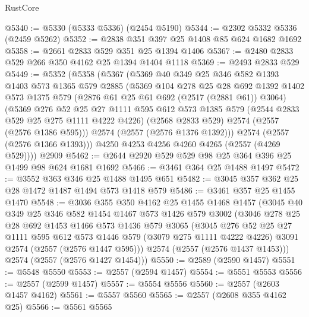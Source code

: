 \begin{lexlean}{RustCore}
\begin{coremodule}
@5340 := @5330 (@5333 @5336) (@2454 @5190)
@5344 := @2302 @5332 @5336 (@2459 @5262)
@5352 := @2838 @351 @397 @25 @1408 @85 @624 @1682 @1692
@5358 := @2661 @2833 @529 @351 @25 @1394 @1406
@5367 := @2480 @2833 @529 @266 @350 @4162 @25 @1394 @1404 @1118
@5369 := @2493 @2833 @529
@5449 := @5352
    (@5358
      (@5367
        (@5369
          @40
          @349
          @25
          @346
          @582
          @1393
          @1403
          @573
          @1365
          @579
          @2885
          (@5369
            @104
            @278
            @25
            @28
            @692
            @1392
            @1402
            @573
            @1375
            @579
            (@2876 @61 @25 @61 @692 (@2517 (@2881 @61)) @3064)
            (@5369
              @276
              @52
              @25
              @27
              @1111
              @595
              @612
              @573
              @1385
              @579
              (@2544 @2833 @529 @25 @275 @1111 @4222 @4226)
              (@2568 @2833 @529)
              @2574
              (@2557 (@2576 @1386 @595)))
            @2574
            (@2557 (@2576 @1376 @1392)))
          @2574
          (@2557 (@2576 @1366 @1393)))
        @4250
        @4253
        @4256
        @4260
        @4265
        (@2557 (@4269 @529))))
    @2909
@5462 := @2644 @2920 @529 @529 @98 @25 @364 @396 @25 @1499 @98 @624 @1681 @1692
@5466 := @3461 @364 @25 @1488 @1497
@5472 := @3552 @363 @346 @25 @1488 @1495 @651
@5482 := @3045 @357 @362 @25 @28 @1472 @1487 @1494 @573 @1418 @579
@5486 := @3461 @357 @25 @1455 @1470
@5548 := @3036
    @355
    @350
    @4162
    @25
    @1455
    @1468
    @1457
    (@3045
      @40
      @349
      @25
      @346
      @582
      @1454
      @1467
      @573
      @1426
      @579
      @3002
      (@3046
        @278
        @25
        @28
        @692
        @1453
        @1466
        @573
        @1436
        @579
        @3065
        (@3045
          @276
          @52
          @25
          @27
          @1111
          @595
          @612
          @573
          @1446
          @579
          (@3079 @275 @1111 @4222 @4226)
          @3091
          @2574
          (@2557 (@2576 @1447 @595)))
        @2574
        (@2557 (@2576 @1437 @1453)))
      @2574
      (@2557 (@2576 @1427 @1454)))
@5550 := @2589 (@2590 @1457)
@5551 := @5548 @5550
@5553 := @2557 (@2594 @1457)
@5554 := @5551 @5553
@5556 := @2557 (@2599 @1457)
@5557 := @5554 @5556
@5560 := @2557 (@2603 @1457 @4162)
@5561 := @5557 @5560
@5565 := @2557 (@2608 @355 @4162 @25)
@5566 := @5561 @5565

\end{coremodule}
\end{lexlean}
